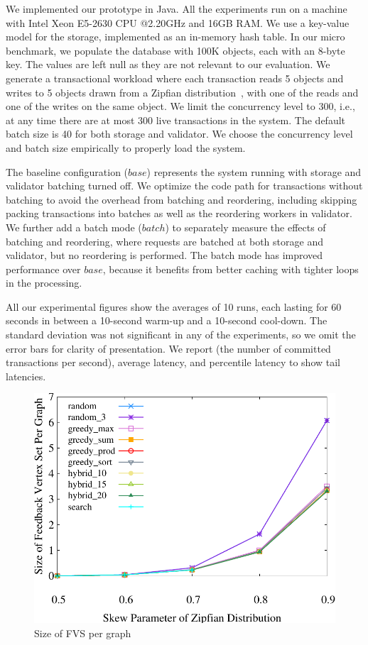 We implemented our prototype in Java. All the experiments run on a machine with
Intel Xeon E5-2630 CPU @2.20GHz and 16GB RAM. We use a key-value model for the
storage, implemented as an in-memory hash table. In our micro benchmark, we populate the database with 100K objects, each with an 8-byte key. The values are left null as they are not relevant to our evaluation. We generate a transactional workload where each transaction reads 5 objects and writes to 5 objects drawn from a Zipfian distribution~\cite{gray1994quickly}, with one of the reads and one of the writes on the same object. We limit the concurrency level to 300, i.e., at any time there are at most 300 live transactions in the system. The default batch size is 40 for both storage and validator. We choose the concurrency level and batch size empirically to properly load the system.

The baseline configuration ($base$) represents the system running with storage and validator batching turned off. We optimize the code path for transactions without batching to avoid the overhead from batching and reordering, including skipping packing transactions into batches as well as the reordering workers in validator. We further add a batch mode ($batch$) to separately measure the effects of batching and reordering, where requests are batched at both storage and validator, but no reordering is performed. The batch mode has improved performance over $base$, because it benefits from better caching with tighter loops in the processing. 

All our experimental figures show the averages of 10 runs, each lasting for 60 seconds in between a 10-second warm-up and a 10-second cool-down. The standard deviation was not significant in any of the experiments, so we omit the error bars for clarity of presentation. We report  (the number of committed transactions per second), average latency, and percentile latency to show tail latencies.


\begin{figure}[t]
    \centering
        \centering
        \includegraphics[width=.4\textwidth]{./exp_fig/fvs/fvs}
        \caption{Size of FVS per graph}
        \label{fig:fvs:fvs}
\end{figure}

